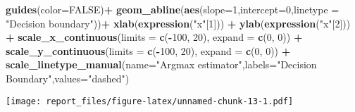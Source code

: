 \documentclass[]{article}
\newenvironment{Shaded}{\begin{snugshade}}{\end{snugshade}}
\newcommand{\KeywordTok}[1]{\textcolor[rgb]{0.13,0.29,0.53}{\textbf{#1}}}
\newcommand{\DataTypeTok}[1]{\textcolor[rgb]{0.13,0.29,0.53}{#1}}
\newcommand{\DecValTok}[1]{\textcolor[rgb]{0.00,0.00,0.81}{#1}}
\newcommand{\StringTok}[1]{\textcolor[rgb]{0.31,0.60,0.02}{#1}}
\newcommand{\OtherTok}[1]{\textcolor[rgb]{0.56,0.35,0.01}{#1}}
\newcommand{\OperatorTok}[1]{\textcolor[rgb]{0.81,0.36,0.00}{\textbf{#1}}}
\newcommand{\NormalTok}[1]{#1}
\begin{document}
\begin{Shaded}
\begin{Highlighting}[]
\StringTok{    }\KeywordTok{guides}\NormalTok{(}\DataTypeTok{color=}\OtherTok{FALSE}\NormalTok{)}\OperatorTok{+}
\StringTok{    }\KeywordTok{geom_abline}\NormalTok{(}\KeywordTok{aes}\NormalTok{(}\DataTypeTok{slope=}\DecValTok{1}\NormalTok{,}\DataTypeTok{intercept=}\DecValTok{0}\NormalTok{,}\DataTypeTok{linetype =} \StringTok{"Decision boundary"}\NormalTok{))}\OperatorTok{+}
\StringTok{    }\KeywordTok{xlab}\NormalTok{(}\KeywordTok{expression}\NormalTok{(}\StringTok{"x"}\NormalTok{[}\DecValTok{1}\NormalTok{])) }\OperatorTok{+}
\StringTok{    }\KeywordTok{ylab}\NormalTok{(}\KeywordTok{expression}\NormalTok{(}\StringTok{"x"}\NormalTok{[}\DecValTok{2}\NormalTok{])) }\OperatorTok{+}
\StringTok{    }\KeywordTok{scale_x_continuous}\NormalTok{(}\DataTypeTok{limits =} \KeywordTok{c}\NormalTok{(}\OperatorTok{-}\DecValTok{100}\NormalTok{, }\DecValTok{20}\NormalTok{), }\DataTypeTok{expand =} \KeywordTok{c}\NormalTok{(}\DecValTok{0}\NormalTok{, }\DecValTok{0}\NormalTok{)) }\OperatorTok{+}
\StringTok{    }\KeywordTok{scale_y_continuous}\NormalTok{(}\DataTypeTok{limits =} \KeywordTok{c}\NormalTok{(}\OperatorTok{-}\DecValTok{100}\NormalTok{, }\DecValTok{20}\NormalTok{), }\DataTypeTok{expand =} \KeywordTok{c}\NormalTok{(}\DecValTok{0}\NormalTok{, }\DecValTok{0}\NormalTok{)) }\OperatorTok{+}
\StringTok{    }\KeywordTok{scale_linetype_manual}\NormalTok{(}\DataTypeTok{name=}\StringTok{"Argmax estimator"}\NormalTok{,}\DataTypeTok{labels=}\StringTok{"Decision Boundary"}\NormalTok{,}\DataTypeTok{values=}\StringTok{"dashed"}\NormalTok{)}
\end{Highlighting}
\end{Shaded}

\texttt{[image: report\_files/figure-latex/unnamed-chunk-13-1.pdf]}

\begin{Shaded}
\end{Shaded}
\end{document}

